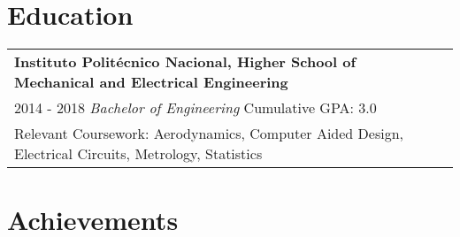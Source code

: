 \documentclass[a4paper,11pt]{article}
\begin{document}
\section{Education}
\begin{tabularx}{\linewidth}{ @{}l r@{} }	

\textbf{Instituto Politécnico Nacional, Higher School of Mechanical and Electrical 
Engineering}\\ 
2014 - 2018 \textit{Bachelor of Engineering } \hfill Cumulative GPA: 3.0\\
Relevant Coursework: Aerodynamics, Computer Aided Design, Electrical Circuits, Metrology, Statistics \\
    \end{tabularx}
\section{Achievements}
\end{document}
